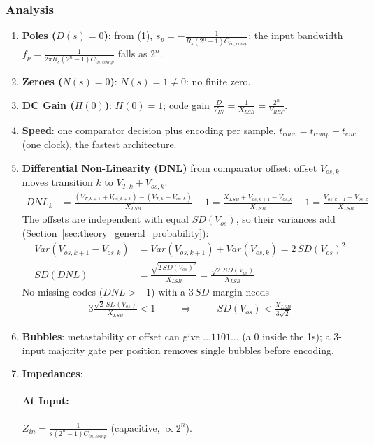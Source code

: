 \subsubsection{Analysis}
\begin{enumerate}
  \item \textbf{Poles (\(D(s) = 0\))}: from (1), \(s_p = -\frac{1}{R_s (2^n - 1) C_{in,comp}}\): the input bandwidth
    \(f_p = \frac{1}{2\pi R_s (2^n - 1) C_{in,comp}}\) falls as \(2^n\).
  \item \textbf{Zeroes (\(N(s) = 0\))}: \(N(s) = 1 \neq 0\): no finite zero.
  \item \textbf{DC Gain (\(H(0)\))}: \(H(0) = 1\); code gain \(\frac{D}{V_{IN}} = \frac{1}{X_{LSB}} = \frac{2^n}{V_{REF}}\).
  \item \textbf{Speed}: one comparator decision plus encoding per sample, \(t_{conv} = t_{comp} + t_{enc}\)
    (one clock), the fastest architecture.
  \item \textbf{Differential Non-Linearity (DNL)} from comparator offset: offset \(V_{os,k}\) moves transition \(k\)
    to \(V_{T,k} + V_{os,k}\):
    \begin{align*}
      DNL_k &= \frac{(V_{T,k+1} + V_{os,k+1}) - (V_{T,k} + V_{os,k})}{X_{LSB}} - 1
      = \frac{X_{LSB} + V_{os,k+1} - V_{os,k}}{X_{LSB}} - 1 = \frac{V_{os,k+1} - V_{os,k}}{X_{LSB}}
    \end{align*}
    The offsets are independent with equal \(SD(V_{os})\), so their variances add
    (Section~\ref{sec:theory_general_probability}):
    \begin{align*}
      Var(V_{os,k+1} - V_{os,k}) &= Var(V_{os,k+1}) + Var(V_{os,k}) = 2\, SD(V_{os})^2 \\
      SD(DNL) &= \frac{\sqrt{2\, SD(V_{os})^2}}{X_{LSB}} = \frac{\sqrt{2}\, SD(V_{os})}{X_{LSB}}
    \end{align*}
    No missing codes (\(DNL > -1\)) with a \(3\,SD\) margin needs
    \begin{align*}
      3\frac{\sqrt{2}\, SD(V_{os})}{X_{LSB}} < 1 \hspace{1cm} \Rightarrow \hspace{1cm} SD(V_{os}) < \frac{X_{LSB}}{3\sqrt{2}}
    \end{align*}
  \item \textbf{Bubbles}: metastability or offset can give \(\ldots 1101 \ldots\)
    (a 0 inside the 1s); a 3-input majority gate per position removes single
    bubbles before encoding.
  \item \textbf{Impedances}:
    \paragraph{At Input:} \(Z_{in} = \frac{1}{s (2^n - 1) C_{in,comp}}\) (capacitive, \(\propto 2^n\)).

\end{enumerate}
